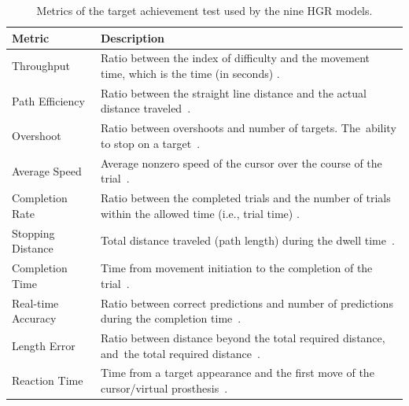 \documentclass[sensors,review,accept,moreauthors,pdftex]{Definitions/mdpi}
\begin{document}
\begin{table}[H]
	\caption{Metrics of the target achievement test used by the nine HGR models.}
	\label{tab:15}
	\centering
	\setlength{\tabcolsep}{3pt}
	\begin{tabular}{m{65pt}m{350pt}}
		\toprule
		\textbf{Metric}& \textbf{Description}\\
		\midrule
		Throughput& Ratio between the index of difficulty and the movement time, which is the time (in seconds) \cite{kamavuako2014usability}.\\
		\midrule
		
		Path Efficiency & Ratio between the straight line distance and the actual distance traveled~\cite{kamavuako2014usability, williams2008evaluation}.\\
		\midrule
		Overshoot& Ratio between overshoots and number of targets. The~ability to stop on a target~\cite{kamavuako2014usability, williams2008evaluation}.\\
		\midrule
		Average Speed& Average nonzero speed of the cursor over the course of the trial~\cite{kamavuako2014usability, williams2008evaluation}.\\
		\midrule
		Completion Rate& Ratio between the completed trials and the number of trials within the allowed time (i.e., trial time) \cite{simon2011target, williams2008evaluation}.\\
		\midrule
		Stopping Distance& Total distance traveled (path length) during the dwell time~\cite{scheme2012validation}.\\
		\midrule
		
		Completion Time& Time from movement initiation to the completion of the trial~\cite{young2014comparison}.\\
		\midrule
		
		Real-time Accuracy& Ratio between correct predictions and number of predictions during the completion time~\cite{ortiz2013biopatrec}.\\
		\midrule
		Length Error& Ratio between distance beyond the total required distance, and~the total required distance~\cite{young2014comparison}.\\
		\midrule
		
		Reaction Time& Time from a target appearance and the first move of the cursor/virtual prosthesis~\cite{wurth2014real}.\\
		\bottomrule
		
	
	\end{tabular}
\end{table}
\end{document}
